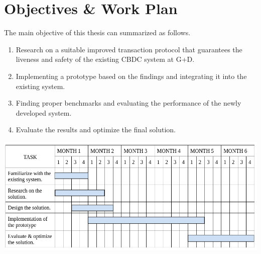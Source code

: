 \documentclass[
  english,        %
  font=times,     %
  onecolumn,      %
]{tumarticle}
\begin{document}
\section{Objectives \& Work Plan}
The main objective of this thesis can summarized as follows. 
\begin{enumerate}
\item Research on a suitable improved transaction protocol that guarantees the liveness and safety of the existing CBDC system at G+D.
\item Implementing a prototype based on the findings and integrating it into the existing system.
\item Finding proper benchmarks and evaluating the performance of the newly developed system.
\item Evaluate the results and optimize the final solution.
\end{enumerate}
\includegraphics[scale=0.5]{images/timeline.png}



\end{document}
